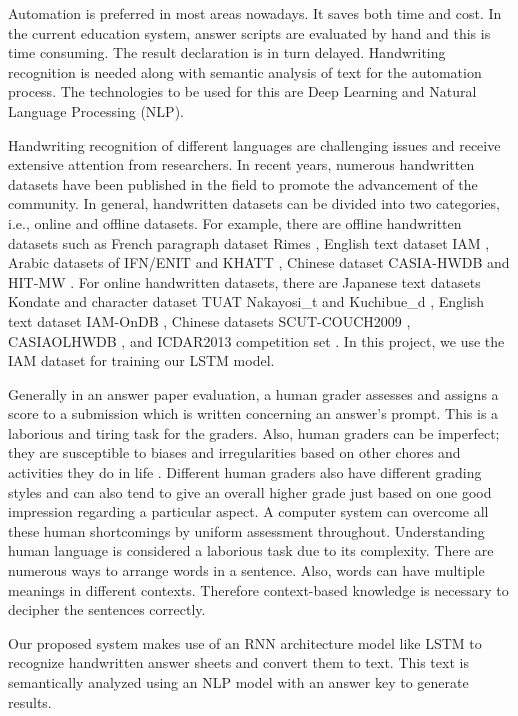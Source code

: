 Automation is preferred in most areas nowadays. It saves both time and cost. In the
current education system, answer scripts are evaluated by hand and this is time consuming. The
result declaration is in turn delayed. Handwriting recognition is needed along with semantic
analysis of text for the automation process. The technologies to be used for this are Deep
Learning and Natural Language Processing (NLP). 

Handwriting recognition of different languages are challenging issues and receive 
extensive attention from researchers.
In recent years, numerous handwritten datasets have been
published in the field to promote the advancement of the
community. In general, handwritten datasets can be divided
into two categories, i.e., online and offline datasets. For
example, there are offline handwritten datasets such as
French paragraph dataset Rimes \cite{augustin2006rimes}, English text dataset
IAM \cite{marti2002iam}, Arabic datasets of IFN/ENIT \cite{pechwitz2002baseline} and KHATT \cite{mahmoud2012khatt},
Chinese dataset CASIA-HWDB \cite{liu2011casia} and HIT-MW \cite{su2006hit}. For
online handwritten datasets, there are Japanese text datasets
Kondate \cite{matsushita2014database} and character dataset TUAT Nakayosi\_t and
Kuchibue\_d \cite{nakagawa2004collection}, English text dataset IAM-OnDB \cite{liwicki2005iam},
Chinese datasets SCUT-COUCH2009 \cite{jin2011scut}, CASIAOLHWDB \cite{liu2011casia}, and ICDAR2013 competition set \cite{yin2013icdar}.
In this project, we use the IAM dataset for training our LSTM model.

Generally in an answer paper evaluation, a human grader assesses and assigns
a score to a submission which is written concerning
an answer's prompt. This is a laborious and tiring task for
the graders. Also, human graders can be imperfect; they are
susceptible to biases and irregularities based on other chores
and activities they do in life \cite{shermis2003automated}. Different human graders also
have different grading styles and can also tend to give an overall higher grade just 
based on one good impression regarding
a particular aspect. A computer system can overcome all
these human shortcomings by uniform assessment throughout. 
Understanding human language is considered a laborious
task due to its complexity. There are numerous ways to
arrange words in a sentence. Also, words can have multiple meanings in different contexts. 
Therefore context-based
knowledge is necessary to decipher the sentences correctly.

Our proposed system makes use of an RNN architecture model like LSTM to recognize
handwritten answer sheets and convert them to text. This text is semantically 
analyzed using an NLP model with an answer key to generate results. 